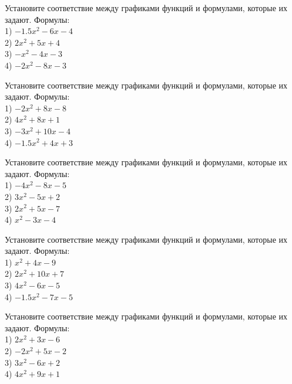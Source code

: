 \documentclass[4apaper]{article}
\begin{document}
\begin{taskBN}{78}
Установите соответствие между графиками функций и формулами, которые их задают. Формулы: \\1) $-1.5x^2-6x-4$\\2) $2x^2+5x+4$\\3) $-x^2-4x-3$\\4) $-2x^2-8x-3$
\end{taskBN}

\begin{taskBN}{79}
Установите соответствие между графиками функций и формулами, которые их задают. Формулы: \\1) $-2x^2+8x-8$\\2) $4x^2+8x+1$\\3) $-3x^2+10x-4$\\4) $-1.5x^2+4x+3$
\end{taskBN}

\begin{taskBN}{80}
Установите соответствие между графиками функций и формулами, которые их задают. Формулы: \\1) $-4x^2-8x-5$\\2) $3x^2-5x+2$\\3) $2x^2+5x-7$\\4) $x^2-3x-4$
\end{taskBN}

\begin{taskBN}{81}
Установите соответствие между графиками функций и формулами, которые их задают. Формулы: \\1) $x^2+4x-9$\\2) $2x^2+10x+7$\\3) $4x^2-6x-5$\\4) $-1.5x^2-7x-5$
\end{taskBN}

\begin{taskBN}{82}
Установите соответствие между графиками функций и формулами, которые их задают. Формулы: \\1) $2x^2+3x-6$\\2) $-2x^2+5x-2$\\3) $3x^2-6x+2$\\4) $4x^2+9x+1$
\end{taskBN}
\end{document}
